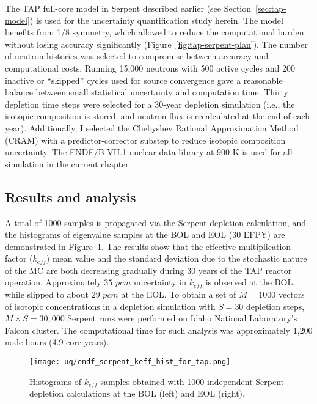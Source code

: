 The \gls{TAP} full-core model in Serpent described earlier (see  
Section~\ref{sec:tap-model}) is used for the uncertainty quantification study 
herein. The model benefits from 1/8 symmetry, which allowed to reduce the 
computational burden without losing accuracy significantly 
(Figure~\ref{fig:tap-serpent-plan}). The number of neutron histories was 
selected to compromise between accuracy and computational costs. Running 
15,000 neutrons with 500 active cycles and 200 inactive or “skipped” cycles 
used for source convergence gave a reasonable balance between small 
statistical uncertainty and computation time. Thirty depletion time steps were 
selected for a 30-year depletion simulation (i.e., the isotopic composition is 
stored, and neutron flux is recalculated at the end of each year). 
Additionally, I selected the Chebyshev Rational Approximation Method (CRAM) 
with a predictor-corrector substep \cite{pusa_computing_2010} to reduce 
isotopic 
composition uncertainty. The ENDF/B-VII.1 nuclear data library at 900 K is 
used for all simulation in the current chapter 
\cite{chadwick_endf/b-vii.1_2011}.

\subsection{Results and analysis}
A total of 1000 samples is propagated via the Serpent depletion calculation,  
and the histograms of eigenvalue samples at the \gls{BOL} and \gls{EOL} (30 
\gls{EFPY}) are demonstrated in Figure~\ref{fig:uq-serp-keff-hist}. The 
results show that the effective multiplication factor ($k_{eff}$) mean value 
and the standard deviation due to the stochastic nature of the \gls{MC} are 
both decreasing gradually during 30 years of the \gls{TAP} reactor operation. 
Approximately $35$ $pcm$ uncertainty in $k_{eff}$ is observed at the 
\gls{BOL}, while slipped to about $29$ $pcm$ at the \gls{EOL}. To obtain 
a set of $M=1000$ vectors of isotopic concentrations in a depletion 
simulation with $S=30$ depletion steps, $M\times S=30,000$ Serpent runs were 
performed on Idaho National Laboratory's Falcon cluster. The computational 
time for such analysis was approximately 1,200 node-hours (4.9 core-years).
\begin{figure}[htp!] %
	\centering
	\texttt{[image: uq/endf\_serpent\_keff\_hist\_for\_tap.png]}
		\vspace{-4mm}
	\caption{Histograms of $k_{eff}$ samples obtained with 1000 independent 
	Serpent depletion calculations at the \gls{BOL} (left) and \gls{EOL} 
	(right).}
	\label{fig:uq-serp-keff-hist}
\end{figure}

